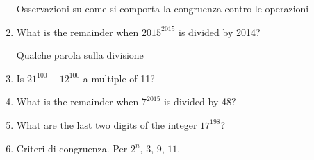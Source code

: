 \documentclass[a4paper]{article}
\theoremstyle{remark}
\theoremstyle{definition}
\begin{document}
\begin{multicols}{2}
\begin{enumerate}
	\textsf{Osservazioni su come si comporta la congruenza contro le operazioni}
	
	\item What is the remainder when $ 2015^{2015} $ is divided by 2014?
	
	\textsf{Qualche parola sulla divisione}
	
	\item Is $ 21^{100} - 12^{100} $ a multiple of 11?
	\item What is the remainder when $ 7^{2015} $ is divided by 48?
	\item What are the last two digits of the integer $ 17^{198} $?
	\item Criteri di congruenza. Per $ 2^n $, $ 3 $, $ 9 $, $ 11 $.
\end{enumerate}

\end{multicols}
\end{document}
